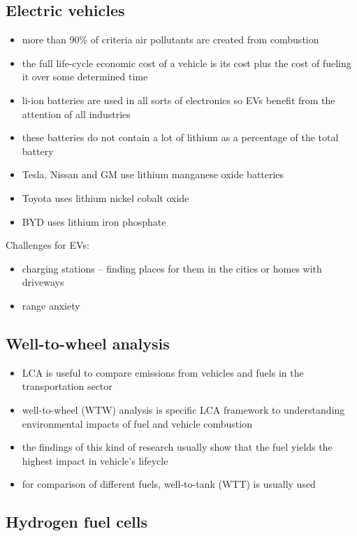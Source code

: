 \subsection{Electric vehicles}
\begin{itemize}
	\item more than 90\% of criteria air pollutants are created from
	combustion
	\item the full life-cycle economic cost of a vehicle is its cost plus
	the cost of fueling it over some determined time
	\item li-ion batteries are used in all sorts of electronics so EVs
	benefit from the attention of all industries
	\item these batteries do not contain a lot of lithium as a percentage
	of the total battery
	\item Tesla, Nissan and GM use lithium manganese oxide batteries
	\item Toyota uses lithium nickel cobalt oxide
	\item BYD uses lithium iron phosphate
\end{itemize}

Challenges for EVs:
\begin{itemize}
	\item charging stations -- finding places for them in the cities or
	homes with driveways
	\item range anxiety
\end{itemize}

\subsection{Well-to-wheel analysis}

\begin{itemize}
	\item LCA is useful to compare emissions from vehicles and fuels in the
	transportation sector
	\item well-to-wheel (WTW) analysis is specific LCA framework to
	understanding environmental impacts of fuel and vehicle combustion
	\item the findings of this kind of research usually show that the
	fuel yields the highest impact in vehicle's lifeycle
	\item for comparison of different fuels, well-to-tank (WTT) is usually
	used
\end{itemize}

\subsection{Hydrogen fuel cells}

